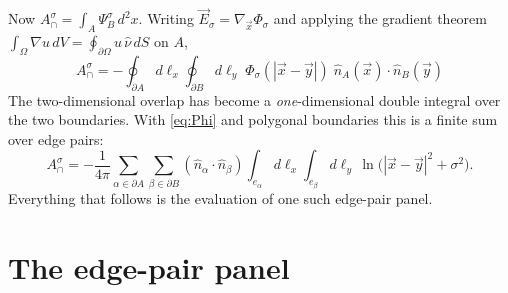 \documentclass[11pt]{article}
\numberwithin{equation}{section}
\newcommand{\vv}[1]{\vec{#1}}
\begin{document}
Now $A_\cap^\sigma=\int_A\Psi_B^\sigma\,d^2x$. Writing $\vv E_\sigma=\nabla_{\!\vv x}\Phi_\sigma$ and
applying the gradient theorem $\int_\Omega\nabla u\,dV=\oint_{\partial\Omega}u\,\hat\nu\,dS$ on $A$,
\begin{equation}\label{eq:Acap-double-boundary}
  \boxed{\;A_\cap^\sigma=-\oint_{\partial A}\!d\ell_x\oint_{\partial B}\!d\ell_y\;
  \Phi_\sigma(|\vv x-\vv y|)\;\hat n_A(\vv x)\!\cdot\!\hat n_B(\vv y)\;}
\end{equation}
The two-dimensional overlap has become a \emph{one}-dimensional double integral over the two
boundaries. With \eqref{eq:Phi} and polygonal boundaries this is a finite sum over edge pairs:
\begin{equation}\label{eq:edge-sum}
  A_\cap^\sigma=-\frac{1}{4\pi}\sum_{\alpha\in\partial A}\sum_{\beta\in\partial B}
  (\hat n_\alpha\!\cdot\!\hat n_\beta)\int_{e_\alpha}\!\!d\ell_x\int_{e_\beta}\!\!d\ell_y\,
  \ln\!\big(|\vv x-\vv y|^2+\sigma^2\big).
\end{equation}
Everything that follows is the evaluation of one such edge-pair panel.

\section{The edge-pair panel}\label{sec:panel}
\end{document}
